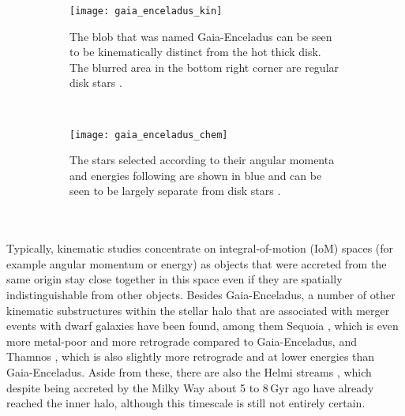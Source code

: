 \documentclass[a4paper,11pt]{article}
\begin{document}
%
\begin{figure}
 \centering
 \begin{subfigure}{0.49\linewidth}
  \centering
  \texttt{[image: gaia\_enceladus\_kin]}
  \caption{The blob that was named Gaia-Enceladus can be seen to be kinematically distinct from the hot thick disk. The blurred area in the bottom right corner are regular disk stars \citep{helmi20,koppelman18}.}
  \label{fig:gaia_enceladus_kin}
 \end{subfigure}
 ~
 \begin{subfigure}{0.49\linewidth}
  \centering
  \texttt{[image: gaia\_enceladus\_chem]}
  \caption{The stars selected according to their angular momenta and energies following \citet{helmi18} are shown in blue and can be seen to be largely separate from disk stars \citep{helmi20}.}
  \label{fig:gaia_enceladus_chem}
 \end{subfigure}
 \caption[Discovery of Gaia-Enceladus]{}
 \label{fig:gaia_enceladus}
\end{figure}\\ \\
%
Typically, kinematic studies concentrate on integral-of-motion (IoM) spaces (for example angular momentum or energy) as objects that were accreted from the same origin stay close together in this space even if they are spatially indistinguishable from other objects. Besides Gaia-Enceladus, a number of other kinematic substructures within the stellar halo that are associated with merger events with dwarf galaxies have been found, among them Sequoia \citep{myeong19}, which is even more metal-poor and more retrograde compared to Gaia-Enceladus, and Thamnos \citep{koppelman19a}, which is also slightly more retrograde and at lower energies than Gaia-Enceladus. Aside from these, there are also the Helmi streams \citep{helmi99}, which despite being accreted by the Milky Way about 5 to 8\,Gyr ago \citep{koppelman19b} have already reached the inner halo, although this timescale is still not entirely certain.\\ \\
%
\end{document}
